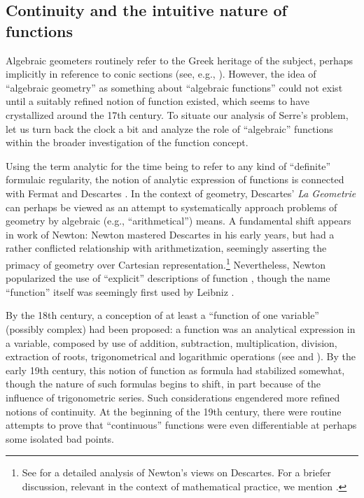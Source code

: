 \documentclass[11pt,leqno]{article}
\renewcommand{\1}{{\rm 1\hspace*{-0.4ex}%
\rule{0.1ex}{1.52ex}\hspace*{0.2ex}}}
\newcommand{\<}[1]{{\langle}#1 {\rangle}}
\theoremstyle{plain}
\theoremstyle{definition}
\theoremstyle{remark}
\numberwithin{equation}{subsection}
\begin{document}
\subsection{Continuity and the intuitive nature of functions}
\label{ss:continuity}
Algebraic geometers routinely refer to the Greek heritage of the subject, perhaps implicitly in reference to conic sections (see, e.g., \cite{Dieudonne1985HistoryAG}).  However, the idea of ``algebraic geometry'' as something about ``algebraic functions'' could not exist until a suitably refined notion of function existed, which seems to have crystallized around the 17th century.  To situate our analysis of Serre's problem, let us turn back the clock a bit and analyze the role of ``algebraic'' functions within the broader investigation of the function concept.  

Using the term analytic for the time being to refer to any kind of ``definite'' formulaic regularity, the notion of analytic expression of functions is connected with Fermat and Descartes \cite[p. 36]{medvedev1991scenes}.  In the context of geometry, Descartes' {\em La Geometrie} \cite{descartes1954geometry} can perhaps be viewed as an attempt to systematically approach problems of geometry by algebraic (e.g., ``arithmetical'') means.  A fundamental shift appears in work of Newton: Newton mastered Descartes in his early years, but had a rather conflicted relationship with arithmetization, seemingly asserting the primacy of geometry over Cartesian  representation.\footnote{See \cite[Part II]{Guicciardini2011NewtonCertaintyMethod} for a detailed analysis of Newton's views on Descartes.  For a briefer discussion, relevant in the context of mathematical practice, we mention \cite[\S 4.1]{Arana2023-ARAMHO}.}  Nevertheless, Newton popularized the use of ``explicit'' descriptions of function \cite[\S 2.4]{medvedev1991scenes}, though the name ``function'' itself was seemingly first used by Leibniz \cite[p. 58]{monna1972function}.  

By the 18th century, a conception of at least a ``function of one variable'' (possibly complex) had been proposed: a function was an analytical expression in a variable, composed by use of addition, subtraction, multiplication, division, extraction of roots, trigonometrical and logarithmic operations (see \cite[p. 58]{monna1972function} and \cite[\S 2.5]{medvedev1991scenes}).  By the early 19th century, this notion of function as formula had stabilized somewhat, though the nature of such formulas begins to shift, in part because of the influence of trigonometric series.  Such considerations engendered more refined notions of continuity. At the beginning of the 19th century, there were routine attempts to prove that ``continuous'' functions were even differentiable at perhaps some isolated bad points.
\end{document}
